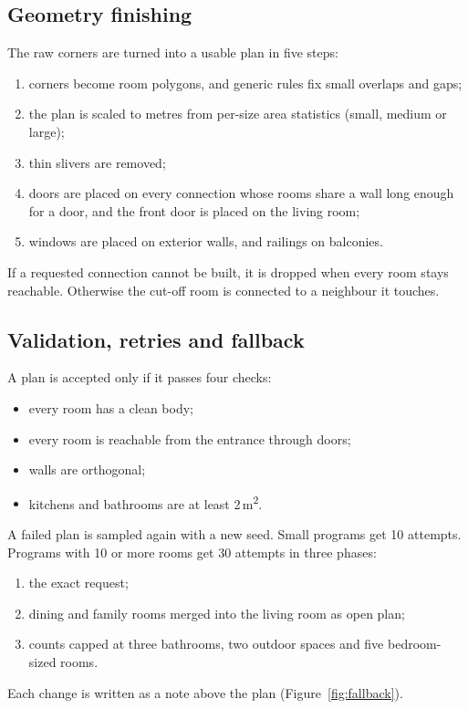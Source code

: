 \documentclass[11pt,a4paper]{article}
\begin{document}
\subsection{Geometry finishing}
The raw corners are turned into a usable plan in five steps:
\begin{enumerate}
  \item corners become room polygons, and generic rules fix small overlaps and gaps;
  \item the plan is scaled to metres from per-size area statistics (small,
        medium or large);
  \item thin slivers are removed;
  \item doors are placed on every connection whose rooms share a wall long enough
        for a door, and the front door is placed on the living room;
  \item windows are placed on exterior walls, and railings on balconies.
\end{enumerate}
If a requested connection cannot be built, it is dropped when every room stays
reachable. Otherwise the cut-off room is connected to a neighbour it touches.

\subsection{Validation, retries and fallback}
A plan is accepted only if it passes four checks:
\begin{itemize}
  \item every room has a clean body;
  \item every room is reachable from the entrance through doors;
  \item walls are orthogonal;
  \item kitchens and bathrooms are at least 2\,m\textsuperscript{2}.
\end{itemize}
A failed plan is sampled again with a new seed. Small programs get 10 attempts.
Programs with 10 or more rooms get 30 attempts in three phases:
\begin{enumerate}
  \item the exact request;
  \item dining and family rooms merged into the living room as open plan;
  \item counts capped at three bathrooms, two outdoor spaces and five bedroom-sized
        rooms.
\end{enumerate}
Each change is written as a note above the plan (Figure~\ref{fig:fallback}).
\end{document}
